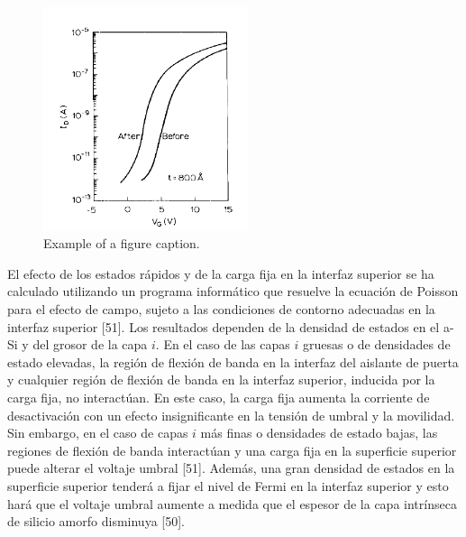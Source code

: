 \documentclass[conference]{IEEEtran}
\begin{document}
\begin{figure}[htbp]
    \centerline{\includegraphics[width=6.0cm]{img/imagen-20.png}}
    \caption{Example of a figure caption.}%
    \label{fig20}
\end{figure} 

    El efecto de los estados rápidos y de la carga fija en la interfaz superior se ha calculado 
    utilizando un programa informático que resuelve la ecuación de Poisson para el efecto de campo, 
    sujeto a las condiciones de contorno adecuadas en la interfaz superior [51].
    Los resultados dependen de la densidad de estados en el a-Si y del grosor de la capa $i$. 
    En el caso de las capas $i$ gruesas o de densidades de estado elevadas, la región de flexión 
    de banda en la interfaz del aislante de puerta y cualquier región de flexión de banda en la 
    interfaz superior, inducida por la carga fija, no interactúan. En este caso, la carga fija 
    aumenta la corriente de desactivación con un efecto insignificante en la tensión de umbral y 
    la movilidad. Sin embargo, en el caso de capas $i$ más finas o densidades de estado bajas, 
    las regiones de flexión de banda interactúan y una carga fija en la superficie superior puede 
    alterar el voltaje umbral [51]. Además, una gran densidad de estados en la superficie superior 
    tenderá a fijar el nivel de Fermi en la interfaz superior y esto hará que el voltaje umbral 
    aumente a medida que el espesor de la capa intrínseca de silicio amorfo disminuya [50].
    
\end{document}
